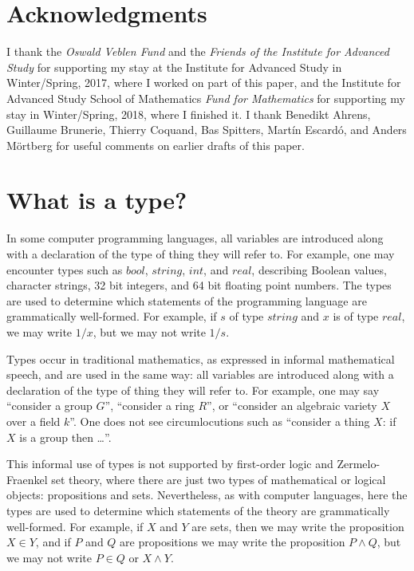 \documentclass[letter,12pt]{amsart}
\theoremstyle{definition}
\theoremstyle{remark}
\numberwithin{equation}{section}
\begin{document}
\section*{Acknowledgments}

I thank the {\em Oswald Veblen Fund} and the {\em Friends of the Institute for Advanced Study} for supporting my stay at the Institute for
Advanced Study in Winter/Spring, 2017, where I worked on part of this paper, and the Institute for Advanced Study School of Mathematics {\em
  Fund for Mathematics} for supporting my stay in Winter/Spring, 2018, where I finished it.  I thank Benedikt Ahrens, Guillaume Brunerie, 
Thierry Coquand, Bas Spitters,  Mart\'in Escard\'o, and Anders M\"ortberg for useful comments on earlier drafts of this paper.

\newpage

\section{What is a type?}

In some computer programming languages, all variables are introduced along with a declaration of the type of thing they will refer to.  For example,
one may encounter types such as $bool$, $string$, $int$, and $real$, describing Boolean values, character strings, 32 bit integers, and 64 bit
floating point numbers.  The types are used to determine which statements of the programming language are grammatically well-formed.
For example, if $s$ of type $string$ and $x$ is of type $real$, we may write $1/x$, but we may not write $1/s$.

Types occur in traditional mathematics, as expressed in informal mathematical speech, and are used in the same way: all variables are introduced
along with a declaration of the type of thing they will refer to.  For example, one may say ``consider a group $G$'', ``consider a ring $R$'',
or ``consider an algebraic variety $X$ over a field $k$''.  One does not see circumlocutions such as ``consider a thing $X$: if $X$ is a group
then \dots''.

This informal use of types is not supported by first-order logic and Zermelo-Fraenkel set theory, where there are just two types of mathematical
or logical objects: propositions and sets.  Nevertheless, as with computer languages, here the types are used to determine which statements of
the theory are grammatically well-formed.  For example, if $X$ and $Y$ are sets, then we may write the proposition $X \in Y$, and if $P$ and $Q$
are propositions we may write the proposition $P \wedge Q$, but we may not write $P \in Q$ or $X \wedge Y$.
\end{document}
